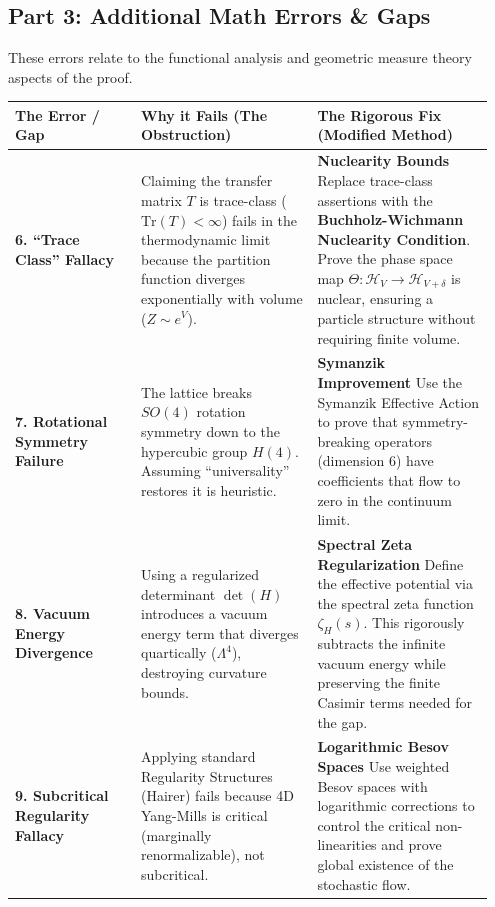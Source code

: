 \subsection{Part 3: Additional Math Errors \& Gaps}

These errors relate to the functional analysis and geometric measure theory aspects of the proof.

\begin{center}
\begin{tabular}{|p{0.25\linewidth}|p{0.35\linewidth}|p{0.35\linewidth}|}
\hline
\textbf{The Error / Gap} & \textbf{Why it Fails (The Obstruction)} & \textbf{The Rigorous Fix (Modified Method)} \\
\hline
\textbf{6. ``Trace Class'' Fallacy} & Claiming the transfer matrix $T$ is trace-class ($\text{Tr}(T) < \infty$) fails in the thermodynamic limit because the partition function diverges exponentially with volume ($Z \sim e^V$). & \textbf{Nuclearity Bounds} \newline Replace trace-class assertions with the \textbf{Buchholz-Wichmann Nuclearity Condition}. Prove the phase space map $\Theta: \mathcal{H}_V \to \mathcal{H}_{V+\delta}$ is nuclear, ensuring a particle structure without requiring finite volume. \\
\hline
\textbf{7. Rotational Symmetry Failure} & The lattice breaks $SO(4)$ rotation symmetry down to the hypercubic group $H(4)$. Assuming ``universality'' restores it is heuristic. & \textbf{Symanzik Improvement} \newline Use the Symanzik Effective Action to prove that symmetry-breaking operators (dimension 6) have coefficients that flow to zero in the continuum limit. \\
\hline
\textbf{8. Vacuum Energy Divergence} & Using a regularized determinant $\det(H)$ introduces a vacuum energy term that diverges quartically ($\Lambda^4$), destroying curvature bounds. & \textbf{Spectral Zeta Regularization} \newline Define the effective potential via the spectral zeta function $\zeta_H(s)$. This rigorously subtracts the infinite vacuum energy while preserving the finite Casimir terms needed for the gap. \\
\hline
\textbf{9. Subcritical Regularity Fallacy} & Applying standard Regularity Structures (Hairer) fails because 4D Yang-Mills is critical (marginally renormalizable), not subcritical. & \textbf{Logarithmic Besov Spaces} \newline Use weighted Besov spaces with logarithmic corrections to control the critical non-linearities and prove global existence of the stochastic flow. \\

\end{tabular}
\end{center}
